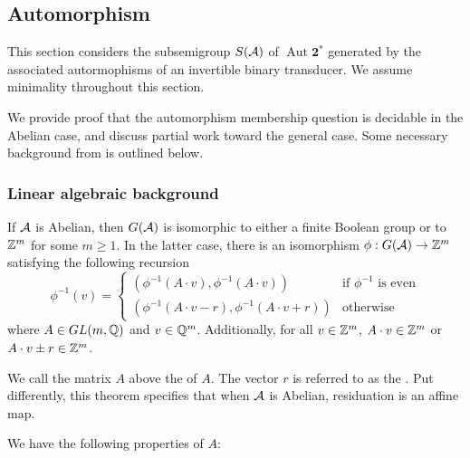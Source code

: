 \documentclass[11pt, titlepage]{article}
\begin{document}
\subsection{Automorphism }

This section considers the subsemigroup $S(\mathcal{A})$ of
$\operatorname{Aut}\textbf{2}^*$ generated by the associated autormophisms of
an invertible binary transducer. We assume minimality throughout this
section.

We provide proof that the automorphism membership question is
decidable in the Abelian case, and discuss partial work toward the
general case. Some necessary background from
\cite{NekrashevychSidki04:automorphisms} is outlined below.

\subsubsection{Linear algebraic background}

\begin{theorem}
  If $\mathcal{A}$ is Abelian, then $G(\mathcal{A})$ is isomorphic to either a finite
  Boolean group or to $\mathbb{Z}^m$ for some $m \geq 1$. In the latter case,
  there is an isomorphism $\phi : G(\mathcal{A}) \rightarrow \mathbb{Z}^m$ satisfying
  the following recursion
\[
  \phi^{-1}(v) =
  \begin{cases}
    (\phi^{-1}(A\cdot v), \phi^{-1}(A \cdot v)) & \text{if $\phi^{-1}$ is even}\\
    (\phi^{-1}(A\cdot v - r), \phi^{-1}(A \cdot v + r)) &
    \text{otherwise}
  \end{cases}
\]
where $A \in GL(m,\mathbb{Q})$ and $v \in \mathbb{Q}^m$. Additionally, for all
$v \in \mathbb{Z}^m$, $A\cdot v \in \mathbb{Z}^m$ or $A\cdot v \pm r \in \mathbb{Z}^m$.
\end{theorem}

We call the matrix $A$ above the  of $A$. The
vector $r$ is referred to as the . Put
differently, this theorem specifies that when $\mathcal{A}$ is Abelian,
residuation is an affine map.

We have the following properties of $A$:
\end{document}
